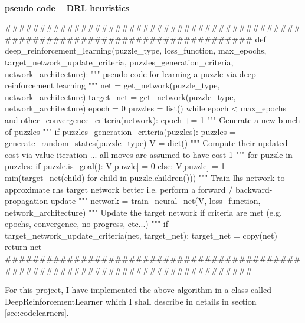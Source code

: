 \paragraph{}{\textbf{pseudo code -- \textbf{DRL} heuristics}}
\begin{pseudocode}
###############################################################################
def deep_reinforcement_learning(puzzle_type,
                                loss_function,
                                max_epochs,
                                target_network_update_criteria,
                                puzzles_generation_criteria,
                                network_architecture):
    """ pseudo code for learning a puzzle via deep reinforcement learning """
    net = get_network(puzzle_type, network_architecture)
    target_net = get_network(puzzle_type, network_architecture)
    epoch = 0
    puzzles = list()
    while epoch < max_epochs and other_convergence_criteria(network):
        epoch += 1
        """ Generate a new bunch of puzzles """
        if puzzles_generation_criteria(puzzles):
            puzzles = generate_random_states(puzzle_type)
        V = dict()
        """ Compute their updated cost via value iteration ... 
             all moves are assumed to have cost 1 """
        for puzzle in puzzles:
            if puzzle.is_goal():
                V[puzzle] = 0
            else:
                V[puzzle] = 1 + min(target_net(child) for child in puzzle.children()))
        """ Train lhs network to approximate rhs target network better
        i.e. perform a forward / backward-propagation update
        """
        network = train_neural_net(V,
                                   loss_function,
                                   network_architecture)
        """ Update the target network if criteria are met 
        (e.g. epochs, convergence, no progress, etc...) """
        if target_network_update_criteria(net, target_net):
            target_net = copy(net)
    return net
###############################################################################
\end{pseudocode}
\black
For this project, I have implemented the above algorithm in a class called DeepReinforcementLearner which I shall describe in details in section \ref{sec:codelearners}.



